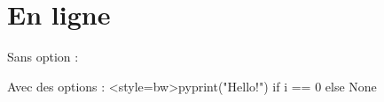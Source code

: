 \documentclass[theme = dark]{../main/main}
\begin{document}
\section{En ligne}

Sans option : 


Avec des options : 
\tdocodein<style=bw>{py}{print("Hello!") if i == 0 else None}
%
%
%
%
%
%
%
%
%
%
%
%
%
\end{document}

